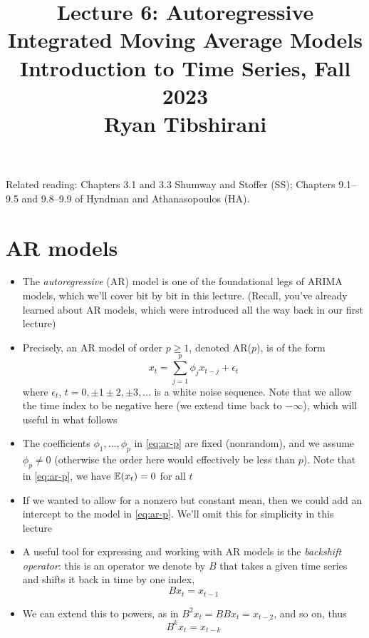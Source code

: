 \documentclass{article}
\title{Lecture 6: Autoregressive Integrated Moving Average Models \\ \smallskip  
\large Introduction to Time Series, Fall 2023 \\ \smallskip
Ryan Tibshirani}
\date{}
\begin{document}
\maketitle
\RaggedRight
\vspace{-50pt}

Related reading: Chapters 3.1 and 3.3 Shumway and Stoffer (SS); Chapters
9.1--9.5 and 9.8--9.9 of Hyndman and Athanasopoulos (HA).   

\section{AR models}

\begin{itemize}
\item The \emph{autoregressive} (AR) model is one of the foundational legs of
  ARIMA models, which we'll cover bit by bit in this lecture. (Recall, you've
  already learned about AR models, which were introduced all the way back in our 
  first lecture)  

\item Precisely, an AR model of order $p \geq 1$, denoted AR($p$), is of the
  form 
  \begin{equation}
  \label{eq:ar-p}
  x_t = \sum_{j=1}^p \phi_j x_{t-j} + \epsilon_t
  \end{equation}
  where $\epsilon_t$, $t = 0, \pm 1 \pm 2, \pm 3,\dots$ is a white noise
  sequence. Note that we allow the time index to be negative here (we extend
  time back to $-\infty$), which will useful in what follows

\item The coefficients $\phi_1,\dots,\phi_p$ in \eqref{eq:ar-p} are fixed
  (nonrandom), and we assume $\phi_p \not= 0$ (otherwise the order here would
  effectively be less than $p$). Note that in \eqref{eq:ar-p}, we have $\mathbb{E}(x_t)
  = 0$ for all $t$

\item If we wanted to allow for a nonzero but constant mean, then we could add
  an intercept to the model in \eqref{eq:ar-p}. We'll omit this for simplicity
  in this lecture  

\item A useful tool for expressing and working with AR models is the
  \emph{backshift operator}: this is an operator we denote by $B$ that takes a 
  given time series and shifts it back in time by one index,
  \[
  B x_t = x_{t-1}
  \]

\item We can extend this to powers, as in $B^2 x_t = B B x_t = x_{t-2}$, and so
  on, thus   
  \[
  B^k x_t = x_{t-k} 
  \]


\end{itemize}
\end{document}
